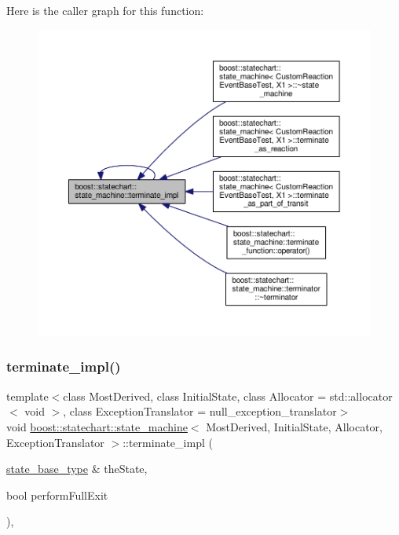 Here is the caller graph for this function\+:
\nopagebreak
\begin{figure}[H]
\begin{center}
\leavevmode
\includegraphics[width=350pt]{classboost_1_1statechart_1_1state__machine_a74a1650e45e284366802f9709b15cf31_icgraph}
\end{center}
\end{figure}
\mbox{\label{classboost_1_1statechart_1_1state__machine_a847e2c019fcd29ed9be547a81090c6a5}} 
\subsubsection{\texorpdfstring{terminate\+\_\+impl()}{terminate\_impl()}\hspace{0.1cm}{\footnotesize\ttfamily [2/2]}}
{\footnotesize\ttfamily template$<$class Most\+Derived, class Initial\+State, class Allocator = std\+::allocator$<$ void $>$, class Exception\+Translator = null\+\_\+exception\+\_\+translator$>$ \\
void \mbox{\hyperlink{classboost_1_1statechart_1_1state__machine}{boost\+::statechart\+::state\+\_\+machine}}$<$ Most\+Derived, Initial\+State, Allocator, Exception\+Translator $>$\+::terminate\+\_\+impl (\begin{DoxyParamCaption}\item[{\mbox{\hyperlink{classboost_1_1statechart_1_1state__machine_a69cc258c29fcabec25c5dc8bedb7d530}{state\+\_\+base\+\_\+type}} \&}]{the\+State,  }\item[{bool}]{perform\+Full\+Exit }\end{DoxyParamCaption})\hspace{0.3cm}{\ttfamily [inline]}, {\ttfamily [private]}}

